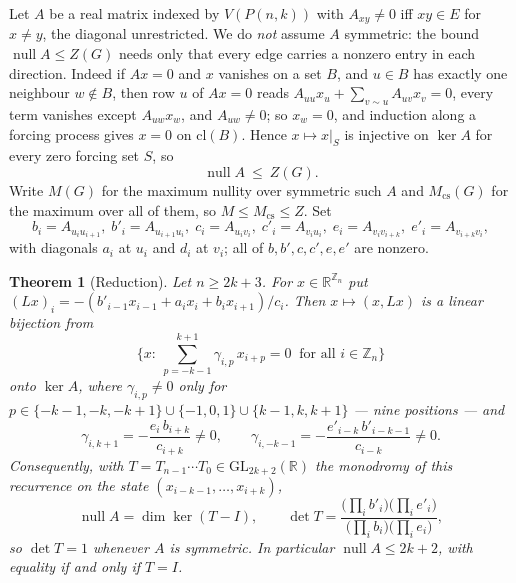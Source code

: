 \documentclass[11pt]{article}
\newtheorem{theorem}{Theorem}
\theoremstyle{definition}
\begin{document}
Let $A$ be a real matrix indexed by $V(P(n,k))$ with $A_{xy}\ne0$ iff
$xy\in E$ for $x\ne y$, the diagonal unrestricted. We do \emph{not} assume
$A$ symmetric: the bound $\operatorname{null}A\le Z(G)$ needs only that every
edge carries a nonzero entry in each direction. Indeed if $Ax=0$ and $x$
vanishes on a set $B$, and $u\in B$ has exactly one neighbour $w\notin B$,
then row $u$ of $Ax=0$ reads $A_{uu}x_u+\sum_{v\sim u}A_{uv}x_v=0$, every term
vanishes except $A_{uw}x_w$, and $A_{uw}\ne0$; so $x_w=0$, and induction along
a forcing process gives $x=0$ on $\mathrm{cl}(B)$. Hence $x\mapsto x|_S$ is
injective on $\ker A$ for every zero forcing set $S$, so
\begin{equation}\label{eq:MZ}
  \operatorname{null}A\ \le\ Z(G).
\end{equation}
Write $M(G)$ for the maximum nullity over symmetric such $A$ and
$M_{\mathrm{cs}}(G)$ for the maximum over all of them, so
$M\le M_{\mathrm{cs}}\le Z$. Set
\[
  b_i=A_{u_iu_{i+1}},\; b'_i=A_{u_{i+1}u_i},\;
  c_i=A_{u_iv_i},\; c'_i=A_{v_iu_i},\;
  e_i=A_{v_iv_{i+k}},\; e'_i=A_{v_{i+k}v_i},
\]
with diagonals $a_i$ at $u_i$ and $d_i$ at $v_i$; all of $b,b',c,c',e,e'$ are
nonzero.

\begin{theorem}[Reduction]\label{thm:red}
Let $n\ge2k+3$. For $x\in\mathbb R^{\mathbb Z_n}$ put
$(Lx)_i=-(b'_{i-1}x_{i-1}+a_ix_i+b_ix_{i+1})/c_i$. Then $x\mapsto(x,Lx)$ is a
linear bijection from
\[
  \Big\{x:\ \textstyle\sum_{p=-k-1}^{k+1}\gamma_{i,p}\,x_{i+p}=0
  \ \text{ for all } i\in\mathbb Z_n\Big\}
\]
onto $\ker A$, where $\gamma_{i,p}\ne0$ only for
$p\in\{-k-1,-k,-k+1\}\cup\{-1,0,1\}\cup\{k-1,k,k+1\}$ --- nine positions --- and
\[
  \gamma_{i,k+1}=-\frac{e_i\,b_{i+k}}{c_{i+k}}\ne0,\qquad
  \gamma_{i,-k-1}=-\frac{e'_{i-k}\,b'_{i-k-1}}{c_{i-k}}\ne0 .
\]
Consequently, with $T=T_{n-1}\cdots T_0\in\mathrm{GL}_{2k+2}(\mathbb R)$ the
monodromy of this recurrence on the state $(x_{i-k-1},\dots,x_{i+k})$,
\[
  \operatorname{null}A=\dim\ker(T-I),\qquad
  \det T=\frac{\big(\prod_ib'_i\big)\big(\prod_ie'_i\big)}
              {\big(\prod_ib_i\big)\big(\prod_ie_i\big)} ,
\]
so $\det T=1$ whenever $A$ is symmetric. In particular
$\operatorname{null}A\le 2k+2$, with equality if and only if $T=I$.
\end{theorem}
\end{document}
